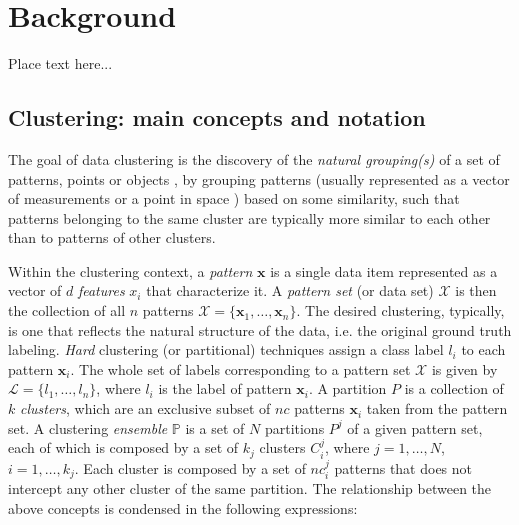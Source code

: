 
\section{Background}
\label{sec:backg}

Place text here...


\subsection{Clustering: main concepts and notation}

The goal of data clustering is the discovery of the \textit{natural grouping(s)} of a set of patterns, points or objects \cite{Jain2010}, by grouping patterns (usually represented as a vector of measurements or a point in space \cite{Jain1999}) based on some similarity, such that patterns belonging to the same cluster are typically more similar to each other than to patterns of other clusters.

Within the clustering context, a \emph{pattern} $\mathbf{x}$ is a single data item represented as a vector of $d$ \emph{features} $x_i$ that characterize it.
A \emph{pattern set} (or data set) $\mathcal{X}$ is then the collection of all $n$ patterns $\mathcal{X} = \{ \mathbf{x}_1, \ldots, \mathbf{x}_n \}$.
The desired clustering, typically, is one that reflects the natural structure of the data, i.e. the original ground truth labeling.
\emph{Hard} clustering (or partitional) techniques assign a class label $l_i$ to each pattern $\mathbf{x}_i$.
The whole set of labels corresponding to a pattern set $\mathcal{X}$ is given by $\mathcal{L} = \{ l_1, \ldots, l_n \}$, where $l_i$ is the label of pattern $\mathbf{x}_i$.
A partition $P$ is a collection of $k$ \emph{clusters}, which are an exclusive subset of $nc$ patterns $\mathbf{x}_i$ taken from the pattern set.
A clustering \emph{ensemble} $\mathbb{P}$ is a set of $N$ partitions $P^j$ of a given pattern set, each of which is composed by a set of $k_j$ clusters $C^j_i$, where $j=1, \ldots, N$, $i=1, \ldots, k_j$.
Each cluster is composed by a set of $nc^j_i$ patterns that does not intercept any other cluster of the same partition.
The relationship between the above concepts is condensed in the following expressions:

